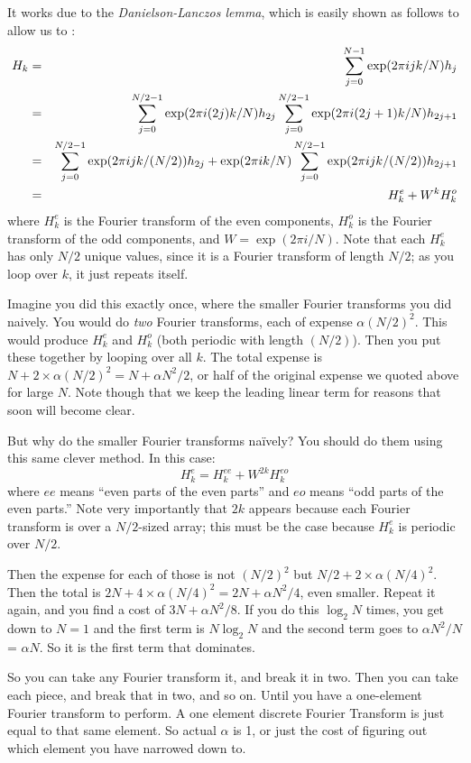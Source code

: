 It works due to the {\it Danielson-Lanczos lemma}, which is easily
shown as follows to allow us to :
\begin{eqnarray}
H_k &=& \sum_{j=0}^{N-1} \exp(2\pi i jk /N) h_j \cr
&=& \sum_{j=0}^{N/2-1} \exp(2\pi i (2j) k /N) h_{2j} 
\sum_{j=0}^{N/2-1} \exp(2\pi i (2j + 1) k /N) h_{2j+1} \cr
&=& \sum_{j=0}^{N/2-1} \exp(2\pi i j k / (N/2)) h_{2j}  +
\exp(2\pi i k /N) \sum_{j=0}^{N/2-1} \exp(2\pi i j k / (N/2)) h_{2j+1} \cr
&=& H_k^e + W^k H_k^o
\end{eqnarray}
where $H_k^e$ is the Fourier transform of the even components, $H_k^o$
is the Fourier transform of the odd components, and $W=\exp(2\pi i
/N)$. Note that each $H_k^e$ has only $N/2$ unique values, since it is
a Fourier transform of length $N/2$; as you loop over $k$, it just
repeats itself.

Imagine you did this exactly once, where the smaller Fourier
transforms you did naively. You would do {\it two} Fourier transforms,
each of expense $\alpha (N/2)^2$. This would produce $H_k^e$ and
$H_k^o$ (both periodic with length $(N/2)$). Then you put these
together by looping over all $k$. The total expense is $N +
2\times \alpha (N/2)^2 = N + \alpha N^2/2$, or half of the original
expense we quoted above for large $N$. Note though that we keep the
leading linear term for reasons that soon will become clear.

But why do the smaller Fourier transforms na\"ively? You should do
them using this same clever method. In this case:
\begin{equation}
H_k^e = H_k^{ee} + W^{2k} H_k^{eo}
\end{equation}
where $ee$ means ``even parts of the even parts'' and $eo$ means ``odd
parts of the even parts.'' Note very importantly that $2k$ appears
because each Fourier transform is over a $N/2$-sized array; this must
be the case because $H_k^e$ is periodic over $N/2$.

Then the expense for each of those is not $(N/2)^2$ but $N/2 +
2 \times\alpha (N/4)^2$. Then the total is $2 N + 4\times \alpha
(N/4)^2 = 2 N + \alpha N^2/4$, even smaller. Repeat it again, and you
find a cost of $3N + \alpha N^2/8$. If you do this $\log_2 N$ times,
you get down to $N=1$ and the first term is $N \log_2 N$ and the
second term goes to $\alpha N^2 / N$ = $\alpha N$. So it is the first
term that dominates.

So you can take any Fourier transform it, and break it in two. Then
you can take each piece, and break that in two, and so on. Until you
have a one-element Fourier transform to perform. A one element
discrete Fourier Transform is just equal to that same element. So
actual $\alpha$ is 1, or just the cost of figuring out which element
you have narrowed down to.

